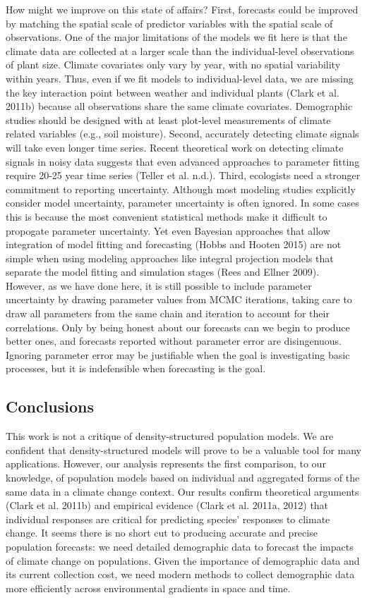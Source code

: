 \documentclass[12pt,]{article}
\begin{document}
How might we improve on this state of affairs? First, forecasts could be
improved by matching the spatial scale of predictor variables with the
spatial scale of observations. One of the major limitations of the
models we fit here is that the climate data are collected at a larger
scale than the individual-level observations of plant size. Climate
covariates only vary by year, with no spatial variability within years.
Thus, even if we fit models to individual-level data, we are missing the
key interaction point between weather and individual plants (Clark et
al. 2011b) because all observations share the same climate covariates.
Demographic studies should be designed with at least plot-level
measurements of climate related variables (e.g., soil moisture). Second,
accurately detecting climate signals will take even longer time series.
Recent theoretical work on detecting climate signals in noisy data
suggests that even advanced approaches to parameter fitting require
20-25 year time series (Teller et al. n.d.). Third, ecologists need a
stronger commitment to reporting uncertainty. Although most modeling
studies explicitly consider model uncertainty, parameter uncertainty is
often ignored. In some cases this is because the most convenient
statistical methods make it difficult to propogate parameter
uncertainty. Yet even Bayesian approaches that allow integration of
model fitting and forecasting (Hobbs and Hooten 2015) are not simple
when using modeling approaches like integral projection models that
separate the model fitting and simulation stages (Rees and Ellner 2009).
However, as we have done here, it is still possible to include parameter
uncertainty by drawing parameter values from MCMC iterations, taking
care to draw all parameters from the same chain and iteration to account
for their correlations. Only by being honest about our forecasts can we
begin to produce better ones, and forecasts reported without parameter
error are disingenuous. Ignoring parameter error may be justifiable when
the goal is investigating basic processes, but it is indefensible when
forecasting is the goal.

\subsection{Conclusions}\label{conclusions}

This work is not a critique of density-structured population models. We
are confident that density-structured models will prove to be a valuable
tool for many applications. However, our analysis represents the first
comparison, to our knowledge, of population models based on individual
and aggregated forms of the same data in a climate change context. Our
results confirm theoretical arguments (Clark et al. 2011b) and empirical
evidence (Clark et al. 2011a, 2012) that individual responses are
critical for predicting species' responses to climate change. It seems
there is no short cut to producing accurate and precise population
forecasts: we need detailed demographic data to forecast the impacts of
climate change on populations. Given the importance of demographic data
and its current collection cost, we need modern methods to collect
demographic data more efficiently across environmental gradients in
space and time.
\end{document}
